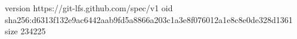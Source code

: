version https://git-lfs.github.com/spec/v1
oid sha256:d6313f132e9ac6442aab9fd5a8866a203c1a3e8f076012a1e8c8e0de328d1361
size 234225
